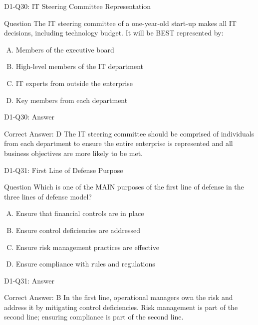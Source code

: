\documentclass{beamer}
\begin{document}
	\begin{frame}{D1-Q30: IT Steering Committee Representation}
		\begin{block}{Question}
			The IT steering committee of a one-year-old start-up makes all IT decisions, including technology budget. It will be BEST represented by:
		\end{block}
		\begin{enumerate}[(A)]
			\item Members of the executive board
			\item High-level members of the IT department
			\item IT experts from outside the enterprise
			\item Key members from each department
		\end{enumerate}
	\end{frame}
	\begin{frame}{D1-Q30: Answer}
		\begin{block}{Correct Answer: D}
			The IT steering committee should be comprised of individuals from each department to ensure the entire enterprise is represented and all business objectives are more likely to be met.
		\end{block}
	\end{frame}
	
	\begin{frame}{D1-Q31: First Line of Defense Purpose}
		\begin{block}{Question}
			Which is one of the MAIN purposes of the first line of defense in the three lines of defense model?
		\end{block}
		\begin{enumerate}[(A)]
			\item Ensure that financial controls are in place
			\item Ensure control deficiencies are addressed
			\item Ensure risk management practices are effective
			\item Ensure compliance with rules and regulations
		\end{enumerate}
	\end{frame}
	\begin{frame}{D1-Q31: Answer}
		\begin{block}{Correct Answer: B}
			In the first line, operational managers own the risk and address it by mitigating control deficiencies. Risk management is part of the second line; ensuring compliance is part of the second line.
		\end{block}
	\end{frame}
	
\end{document}
